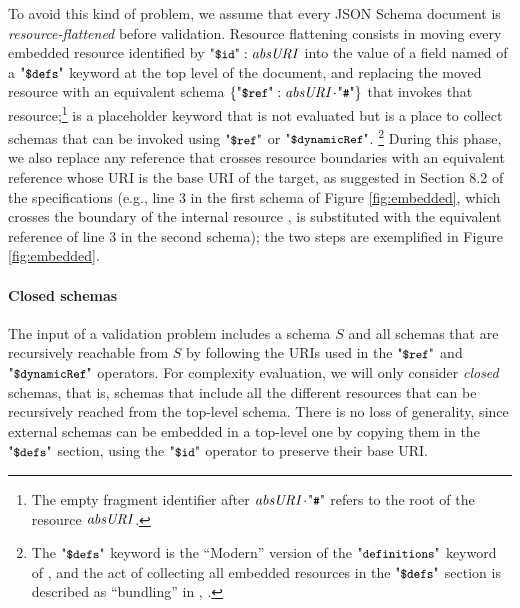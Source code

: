 To avoid this kind of problem, we assume that every
JSON Schema document is \emph{resource-flattened} before validation.
Resource flattening consists in moving every embedded resource identified by
$\qdid: \key{absURI}$ into the value of a field named  of a $\qddefs$ keyword at the top level of the
document, and replacing the moved resource with an equivalent schema $\{ \qdref: \key{absURI}\cat\qkw{\#} \}$ that invokes 
that resource;\footnote{The empty fragment identifier after $\key{absURI}\cat\qkw{\#}$ refers to the root of the resource $\mathit{absURI}$.}
{\qddefs} is a placeholder keyword that is not evaluated  but is a place to collect schemas
that can be invoked using $\qdref$ or 
$\qddref$.
\footnote{The $\qddefs$ keyword is the ``Modern'' version of the $\qdefs$ keyword of \cJS, and the act of collecting all embedded resources
in the $\qddefs$ section is described as ``bundling'' in {\DTwenty}, 
.} 
During this phase, we also replace any reference that crosses resource boundaries 
with an equivalent %
reference whose URI is the base URI of the target, as suggested in Section 8.2 of the specifications \citep{specs2020} 
(e.g., line 3 in the first schema of Figure \ref{fig:embedded},
which crosses the boundary of the internal resource ,
is substituted with the equivalent reference of line 3 in the second schema);
the two steps are exemplified in Figure  \ref{fig:embedded}.

\paragraph{Closed schemas}

The input of a validation problem includes a schema $S$ and all schemas that are recursively reachable from
$S$ by following the URIs used in the $\qdref$ and $\qddref$ operators. For complexity evaluation, we will only consider \emph{closed} schemas, that is, schemas that include all the different
resources that can be recursively reached from the top-level schema. %
There is no loss of generality, since external schemas can be embedded in a top-level one by copying
them in the $\qddefs$ section, using the $\qdid$ operator to preserve their base URI.

%
%
%

